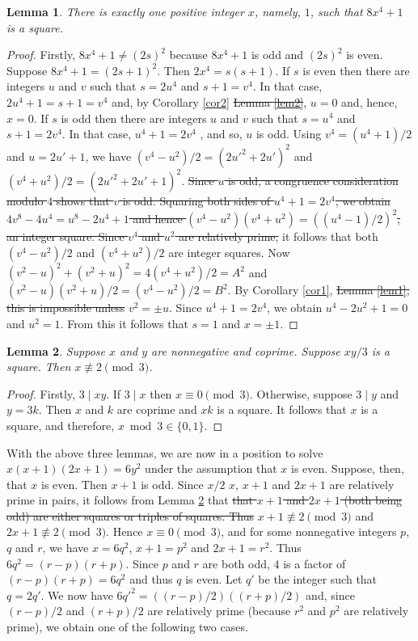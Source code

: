 \documentclass{article}
\newtheorem{lemma}{Lemma}
\numberwithin{lemma}{section}
\newcommand{\changed}[1]{{\color{teal} #1}}
\begin{document}
\begin{lemma}\label{lem3}
There is exactly one positive integer $x$, namely, $1$, such that $8x^4+1$ is a square.
\end{lemma}
\begin{proof}
\changed{Firstly, $8x^4+1 \ne (2s)^2$ because $8x^4+1$ is odd and $(2s)^2$ is even.}
Suppose $8x^4+1 = (2s+1)^2$. Then $2x^4 = s(s+1)$. If $s$ is even then
there are integers $u$ and $v$ such that $s = 2u^4$ and $s+1 = v^4$. In that case,
$2u^4+1 = s+1 = v^4$ and, by \changed{Corollary \ref{cor2}} \sout{Lemma \ref{lem2}}, $u = 0$ and, hence, $x = 0$. If $s$ is odd
then there are integers $u$ and $v$ such that $s = u^4$ and $s+1 = 2v^4$. In
that case, $u^4+1 = 2v^4$\changed{, and so, $u$ is odd. Using $v^4 = (u^4+1)/2$ and $u = 2u'+1$, we have $(v^4-u^2)/2 = (2u'^2+2u')^2$ and $(v^4+u^2)/2 = (2u'^2+2u'+1)^2$.} \sout{Since $u$ is odd, a congruence consideration modulo $4$
shows that $v$ is odd. Squaring both sides of $u^4+1 = 2v^4$, we obtain $4v^8-4u^4 = u^8-2u^4+1$
and hence $(v^4-u^2)(v^4+u^2) = ((u^4-1)/2)^2$, an integer square.
Since $v^4$ and $u^2$ are relatively prime,} it follows that both $(v^4-u^2)/2$ and
$(v^4+u^2)/2$ are integer squares. Now $(v^2-u)^2 + (v^2+u)^2 = 4(v^4+u^2)/2 = A^2$ and $(v^2-u)(v^2+u)/2 = (v^4-u^2)/2 = B^2$. By \changed{Corollary \ref{cor1},} \sout{Lemma \ref{lem1}, this is impossible unless}
$v^2 = \pm u$. Since $u^4+1 = 2v^4$, we obtain $u^4-2u^2+1 = 0$ and $u^2 = 1$. From this
it follows that $s = 1$ and $x = \pm 1$.
\end{proof}

\changed{
\begin{lemma}\label{lem3a}
Suppose $x$ and $y$ are nonnegative and coprime. Suppose $xy/3$ is a square. Then $x \not\equiv 2 \pmod 3$.
\end{lemma}
\begin{proof}
Firstly, $3 \mid xy$. If $3 \mid x$ then $x \equiv 0 \pmod 3$. Otherwise, suppose $3 \mid y$ and $y = 3k$. Then $x$ and $k$ are coprime and $xk$ is a square. It follows that $x$ is a square, and therefore, $x \bmod 3 \in \{0, 1\}$.
\end{proof}
}

With the above three lemmas, we are now in a position to solve $x(x+1)(2x+1) = 6y^2$
under the assumption that $x$ is even. Suppose, then, that $x$ is even.
Then $x+1$ is odd. Since \changed{$x/2$} \sout{$x$}, $x+1$ and $2x+1$ are relatively prime in pairs, it
follows \changed{from Lemma \ref{lem3a} that} \sout{that $x+1$ and $2x+1$ (both being odd) are either squares or triples of
squares. Thus} $x+1 \not\equiv 2 \pmod 3$ and $2x+1 \not\equiv 2 \pmod 3$. Hence $x \equiv 0 \pmod 3$,
and for some nonnegative integers $p$, $q$ and $r$, we have $x = 6q^2$, $x+1 = p^2$ and
$2x+1 = r^2$. Thus $6q^2 = (r-p)(r+p)$. Since $p$ and $r$ are both odd, $4$ is a factor
of $(r-p)(r+p) = 6q^2$ and thus $q$ is even. Let $q'$ be the integer such that $q = 2q'$.
We now have $6q'^2 = ((r-p)/2)((r+p)/2)$ and, since $(r-p)/2$ and $(r+p)/2$
are relatively prime (because $r^2$ and $p^2$ are relatively prime), we obtain one of the
following two cases.
\end{document}
